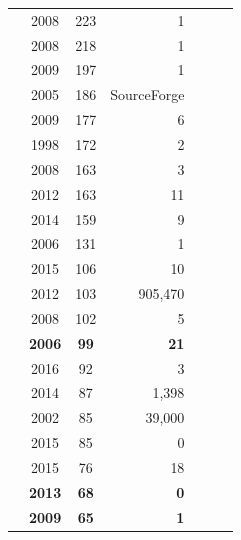 \documentclass[sigconf,review]{acmart}
\newcommand{\cmark}{\ding{51}}%
\newcommand{\xmark}{\ding{55}}%
\begin{document}
\begin{table}
\begin{tabular}{r|@{~}c|@{~}c|@{~}r|@{~}c|@{~}c|@{~}c}
        \cite{Pinzger2008CanDN} & 2008 &	223 &	1 & \cmark & \cmark & \cmark \\
        \cite{Meneely2008PredictingFW} & 2008 &	218 &	1 & \cmark & \cmark & \cmark \\
        \cite{Wolf:2009:PBF:1555001.1555017} & 2009 &	197 &	1 & \xmark & \cmark & \cmark \\
        \cite{1385642} & 2005 &	186 &	SourceForge & \xmark & \xmark & \cmark \\
        \cite{5362091} & 2009 &	177 &	6 & \cmark & \xmark & \cmark \\
        \cite{671604} & 1998 & 172 &	2 & \cmark & \xmark & \xmark \\
        \cite{Weyuker2008} & 2008 & 163 &	3 & \cmark & \cmark & \cmark \\
        \cite{Pamela} & 2012 &	163 &	11 & \cmark & \cmark & \cmark \\
        \cite{Okutan2014} & 2014 &	159 &	9 & \cmark & \cmark & \xmark \\
        \cite{Knab} & 2006 &	131 &	1 & \cmark & \cmark & \xmark \\
        \cite{HE2015170} & 2015 &	106 &	10 & \cmark & \cmark & \xmark \\
        \cite{Majumder_2012} & 2012 &	103 &	905,470 & \xmark & \xmark & \cmark \\
        \cite{Ratzinger:2008:RRS:1370750.1370759} & 2008 &	102 &	5 & \cmark & \xmark & \xmark \\
        \rowcolor{blue!10} \textbf{\cite{robles2006contributor}} & \textbf{2006} &	\textbf{99} & \textbf{21} & \cmark & \xmark & \xmark \\
        \cite{McIntosh2016} & 2016 &	92 &	3 & \xmark & \cmark & \cmark \\
        \cite{fengzhang} & 2014 &	87 &	1,398 & \cmark & \xmark & \xmark \\
        \cite{gregmadey} & 2002 &	85 &	39,000 & \xmark & \xmark & \cmark \\
        \cite{KUPIAINEN2015143} & 2015 &	85 & 0	 & \cmark & \cmark & \cmark \\
        \cite{Madeyski2015} & 2015 &	76 &	18 & \cmark & \cmark & \xmark \\
       \rowcolor{blue!10}  \textbf{\cite{moniruzzaman2013comparative}} & \textbf{2013} &	\textbf{68} & \textbf{0} & \xmark & \cmark & \xmark \\
       \rowcolor{blue!10}  \textbf{\cite{robles2009evolution}} & \textbf{2009} &	\textbf{65} & \textbf{1} & \xmark & \cmark & \cmark \\

\end{tabular}
\end{table}
\end{document}
